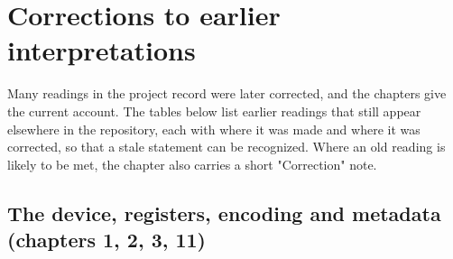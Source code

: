 \chapter{Corrections to earlier interpretations}\label{app:a}

Many readings in the project record were later corrected, and the chapters give the current account. The tables below
list earlier readings that still appear elsewhere in the repository, each with where it was made and where it was
corrected, so that a stale statement can be recognized. Where an old reading is likely to be met, the chapter also
carries a short "Correction" note.

\section{The device, registers, encoding and metadata (chapters 1, 2, 3, 11)}\label{sec:device-registers-encoding-2}

